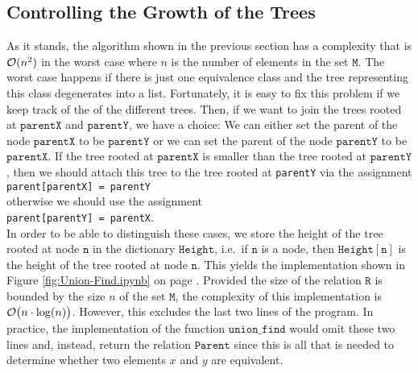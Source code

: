 \subsection{Controlling the Growth of the Trees}
As it stands, the algorithm shown in the previous section has a complexity that is $\mathcal{O}(n^2)$ in the
worst case where $n$ is the number of elements in the set $ \texttt{M}$.  The worst case happens if there
is just one equivalence class and the tree representing this class degenerates into a list.
Fortunately, it is easy to fix this problem if we keep track of the  of the
different trees.  Then, if we want to join the trees rooted at $\texttt{parentX}$ and
$\texttt{parentY}$, we have a choice: We can either set the parent of the node $\texttt{parentX}$ to
be $\texttt{parentY}$ or we can set the parent of the node $\texttt{parentY}$ to be $\texttt{parentX}$.
If the tree rooted at $\texttt{parentX}$ is smaller than the tree rooted at $\texttt{parentY}$, then we should
attach this tree to the tree rooted at \texttt{parentY} via the assignment
\\[0.2cm]
\hspace*{1.3cm}
\texttt{parent[parentX] = parentY}
\\[0.2cm]
otherwise we should use the assignment
\\[0.2cm]
\hspace*{1.3cm}
\texttt{parent[parentY] = parentX}.
\\[0.2cm]
In order to be able to distinguish these cases, we store the height of the tree rooted at node
$\texttt{n}$ in the dictionary $\texttt{Height}$, i.e.~if $\texttt{n}$ is a node, then $\texttt{Height}[\mathtt{n}]$ is
the height of the tree rooted at node $\texttt{n}$.  This yields the implementation shown in Figure
\ref{fig:Union-Find.ipynb} on page \pageref{fig:Union-Find.ipynb}.  Provided the size  of the relation
$\texttt{R}$ is bounded by the size $n$ of the set $ \texttt{M}$, the complexity of this
implementation is $\mathcal{O}\bigl(n \cdot \log(n)\bigr)$.  However, this excludes the last two lines of
the program.  In practice, the implementation of the function $\texttt{union\_find}$ would omit these
two lines and, instead, return the relation $\texttt{Parent}$ since this is all that is needed to
determine whether two elements $x$ and $y$ are equivalent. 

